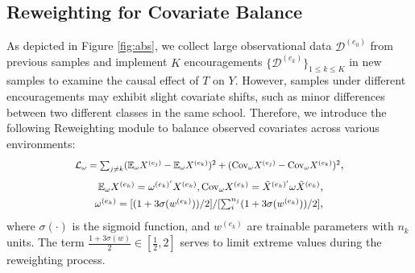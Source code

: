 \documentclass[journal]{IEEEtran}
\newcommand*{\Scale}[2][4]{\scalebox{#1}{$#2$}}
\begin{document}
\subsection{Reweighting for Covariate Balance}
\label{sec:41}
As depicted in Figure \ref{fig:abs}, we collect large observational data $\mathcal{D}^{(e_0)}$ from previous samples and implement $K$ encouragements $\{\mathcal{D}^{(e_{k})}\}_{1 \leq k \leq K}$ in new samples to examine the causal effect of $T$ on $Y$. However, samples under different encouragements may exhibit slight covariate shifts, such as minor differences between two different classes in the same school. Therefore, we introduce the following Reweighting module to balance observed covariates across various environments: 
\begin{eqnarray}
\Scale[0.85]{
\mathcal{L}_{\omega} = \sum_{j \not = k}
(\mathbb{E}_{\omega}X^{(e_j)} - \mathbb{E}_{\omega}X^{(e_k)})^2 
+ 
(\text{Cov}_{\omega}X^{(e_j)} - \text{Cov}_{\omega}X^{(e_k)})^2}, \nonumber 
\end{eqnarray}
\vspace{-19pt}
\begin{eqnarray}
\Scale[0.9]{
\mathbb{E}_{\omega}X^{(e_k)} = \omega^{(e_k)^\prime} X^{(e_k)}, \text{Cov}_{\omega}X^{(e_k)} = {\tilde{X}^{(e_k)^\prime}} \omega \tilde{X}^{(e_k)}}, \label{eq:17}\\
\Scale[0.9]{
\omega^{(e_k)} = [(1+3\sigma(w^{(e_k)}))/2] / [\sum_i^{n_j}(1+3\sigma(w^{(e_k)}))/2]}, \nonumber
\end{eqnarray}
where $\sigma(\cdot)$ is the sigmoid function, and $w^{(e_k)}$ are trainable parameters with $n_k$ units. The term $\frac{1+3\sigma(w)}{2} \in [\frac{1}{2}, 2]$ serves to limit extreme values during the reweighting process.
\end{document}
